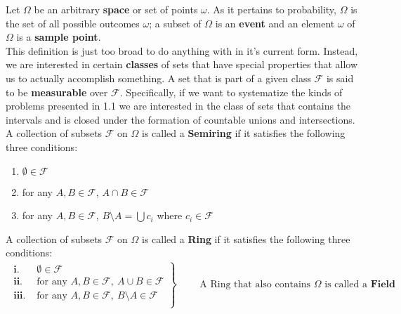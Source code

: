  \quad 


Let $\Omega$ be an arbitrary \textbf{space} or set of points $\omega$. As it pertains to probability, $\Omega$ is the set of all possible outcomes $\omega$; a subset of $\Omega$ is an \textbf{event} and an element $\omega$ of $\Omega$ is a \textbf{sample point}. \\[10pt]
This definition is just too broad to do anything with in it's current form. Instead, we are interested in certain \textbf{classes} of sets that have special properties that allow us to actually accomplish something. A set that is part of a given class $\mathcal{F}$ is said to be \textbf{measurable} over $\mathcal{F}$. Specifically, if we want to systematize the kinds of problems presented in 1.1 we are interested in the class of sets that contains the intervals and is closed under the formation of countable unions and intersections.\\[10pt]

A collection of subsets $\mathcal{F}$ on $\Omega$ is called a \textbf{Semiring} if it satisfies the following three conditions:
\begin{enumerate}[label=\textbf{\roman*.}, topsep=0pt, itemsep=-3pt]
    \item $\emptyset \in \mathcal{F}$
    \item for any $A,B\in \mathcal{F}$, $A\cap B \in \mathcal{F}$
    \item for any $A,B\in \mathcal{F}$, $B \setminus A = \bigcup c_i$ where $c_i \in \mathcal{F}$ 
\end{enumerate}
\vspace{10pt}
A collection of subsets $\mathcal{F}$ on $\Omega$ is called a \textbf{Ring} if it satisfies the following three conditions:
\vspace{-10pt}
\[
\begin{split}
    \left.
    \begin{aligned}
        \textbf{i. } & \emptyset \in \mathcal{F}\\
        \textbf{ii. } & \text{for any }A,B\in \mathcal{F},\ A\cup B \in \mathcal{F}\\
        \textbf{iii. } & \text{for any }A,B\in \mathcal{F},\ B \setminus A \in \mathcal{F}\\
    \end{aligned}
    \right\}
\end{split}
\begin{split}
    \begin{aligned}
        & \text{ A Ring that also contains } \Omega \text{ is called a } \textbf{Field}
    \end{aligned}
\end{split}
\]

